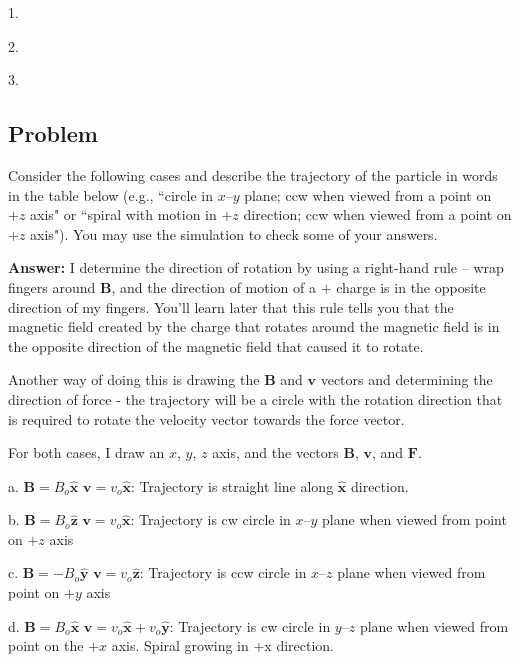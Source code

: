 \documentclass{article}
\begin{document}
1.

2.

3.

\ifsolutions\else
\newpage
\fi

\subsection{Problem}

Consider the following cases and describe the trajectory of the particle in words in the table below (e.g., ``circle in $x$--$y$ plane; ccw when viewed from a point on $+z$ axis" or ``spiral with motion in $+z$ direction; ccw when viewed from a point on $+z$ axis"). You may use the simulation to check some of your answers. 

\ifsolutions
{\bf Answer:} I determine the direction of rotation by using a right-hand rule -- wrap fingers around $\mathbf{B}$, and the direction of motion of a $+$ charge is in the opposite direction of my fingers. You'll learn later that this rule tells you that the magnetic field created by the charge that rotates around the magnetic field is in the opposite direction of the magnetic field that caused it to rotate.

Another way of doing this is drawing the $\mathbf{B}$ and $\mathbf{v}$ vectors and determining the direction of force - the trajectory will be a circle with the rotation direction that is required to rotate the velocity vector towards the force vector.

For both cases, I draw an $x$, $y$, $z$ axis, and the vectors $\mathbf{B}$, $\mathbf{v}$, and $\mathbf{F}$.

a. $\mathbf{B} =  B_o\hat{\mathbf{x}}$  $\mathbf{v} = v_o\hat{\mathbf{x}}$: Trajectory is straight line along $\hat{\mathbf{x}}$ direction.

b. $\mathbf{B} =  B_o\hat{\mathbf{z}}$ $\mathbf{v} = v_o\hat{\mathbf{x}}$: Trajectory is cw circle in $x$--$y$ plane when viewed from point on $+z$ axis

c. $\mathbf{B} = -B_o\hat{\mathbf{y}}$ $\mathbf{v} = v_o\hat{\mathbf{z}}$: Trajectory is ccw circle in $x$--$z$ plane when viewed from point on $+y$ axis

d. $\mathbf{B} = B_o\hat{\mathbf{x}} $ $\mathbf{v} = v_o\hat{\mathbf{x}}+v_o\hat{\mathbf{y}}$: Trajectory is cw circle in $y$--$z$ plane when viewed from point on the $+x$ axis. Spiral growing in +x direction.
\end{document}
